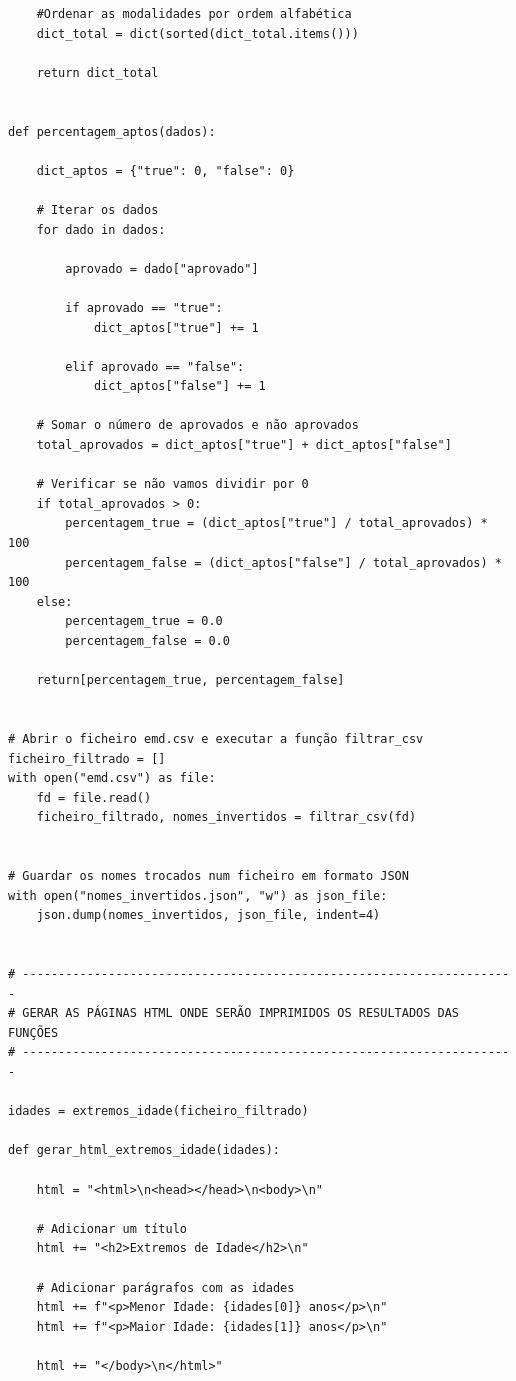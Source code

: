\documentclass[11pt,a4paper]{report}%
\begin{document}
\begin{verbatim}
    #Ordenar as modalidades por ordem alfabética
    dict_total = dict(sorted(dict_total.items()))

    return dict_total


def percentagem_aptos(dados):

    dict_aptos = {"true": 0, "false": 0}

    # Iterar os dados
    for dado in dados:

        aprovado = dado["aprovado"]

        if aprovado == "true":
            dict_aptos["true"] += 1

        elif aprovado == "false":
            dict_aptos["false"] += 1
    
    # Somar o número de aprovados e não aprovados
    total_aprovados = dict_aptos["true"] + dict_aptos["false"]

    # Verificar se não vamos dividir por 0
    if total_aprovados > 0:
        percentagem_true = (dict_aptos["true"] / total_aprovados) * 100
        percentagem_false = (dict_aptos["false"] / total_aprovados) * 100
    else:
        percentagem_true = 0.0
        percentagem_false = 0.0

    return[percentagem_true, percentagem_false]


# Abrir o ficheiro emd.csv e executar a função filtrar_csv
ficheiro_filtrado = []
with open("emd.csv") as file:
    fd = file.read()
    ficheiro_filtrado, nomes_invertidos = filtrar_csv(fd)


# Guardar os nomes trocados num ficheiro em formato JSON
with open("nomes_invertidos.json", "w") as json_file:
    json.dump(nomes_invertidos, json_file, indent=4)


# ---------------------------------------------------------------------
# GERAR AS PÁGINAS HTML ONDE SERÃO IMPRIMIDOS OS RESULTADOS DAS FUNÇÕES
# ---------------------------------------------------------------------

idades = extremos_idade(ficheiro_filtrado) 

def gerar_html_extremos_idade(idades):  

    html = "<html>\n<head></head>\n<body>\n"
    
    # Adicionar um título
    html += "<h2>Extremos de Idade</h2>\n"

    # Adicionar parágrafos com as idades
    html += f"<p>Menor Idade: {idades[0]} anos</p>\n"
    html += f"<p>Maior Idade: {idades[1]} anos</p>\n"
    
    html += "</body>\n</html>"


\end{verbatim}
\end{document}
